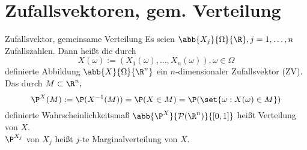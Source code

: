\section*{Zufallsvektoren, gem. Verteilung}

\begin{karte}{Zufallsvektor, gemeinsame Verteilung}
    Es seien \( \abb{X_j}{\Omega}{\R}, j = 1,\ldots,n \) Zufallszahlen. 
    Dann heißt die durch 
    \[ X(\omega) := (X_1(\omega), \ldots, X_n(\omega)), \omega \in \Omega \]
    definierte Abbildung \( \abb{X}{\Omega}{\R^n} \) ein \(n\)-dimensionaler 
    Zufallsvektor (ZV). 
    Das durch \( M \subset \R^n, \)
    \[ \P^X(M) := \P(X^{-1}(M)) = \P(X \in M) 
    = \P(\set{ \omega : X(\omega) \in M }) \]
    definierte Wahrscheinlichkeitsmaß 
    \( \abb{\P^X}{\mathcal{P}(\R^n)}{[0,1]} \) 
    heißt Verteilung von \(X\).\\
    \( \P^{X_j} \) von \(X_j\) heißt \(j\)-te Marginalverteilung von \(X\).
\end{karte}
